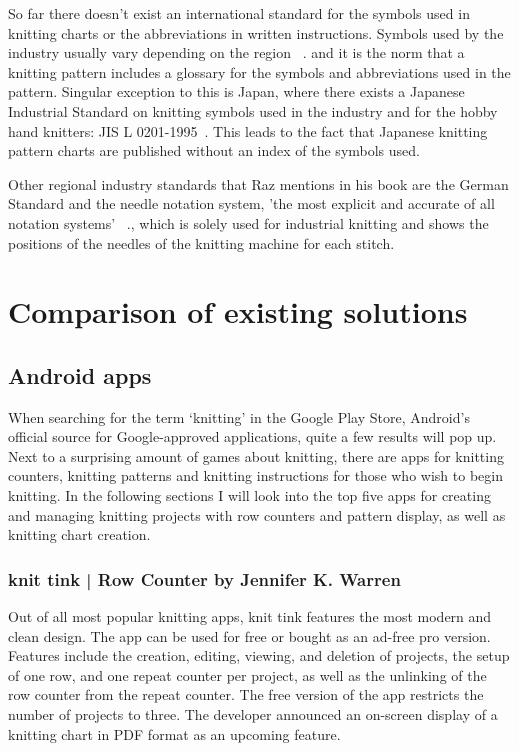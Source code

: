\documentclass[a4paper,11pt]{kth-mag}
\begin{document}
So far there doesn't exist an international standard for the symbols used in
knitting charts or the abbreviations in written instructions. Symbols used by
the industry usually vary depending on the region ~\cite[p57]{raz1993}. and it is the
norm that a knitting pattern includes a glossary for the symbols and
abbreviations used in the pattern. Singular exception to this is Japan, where
there exists a Japanese Industrial Standard on knitting symbols used in the
industry and for the hobby hand knitters: JIS L 0201-1995~\cite{jkca1995}. This
leads to the fact that Japanese knitting pattern charts are published without an
index of the symbols used.

Other regional industry standards that Raz mentions in his book are the German
Standard and the needle notation system, 'the most explicit and accurate of all
 notation systems' ~\cite[p58]{raz1993}., which is solely used for industrial knitting
 and shows the positions of the needles of the knitting machine for each stitch.

\section{Comparison of existing solutions}

\subsection{Android apps}
When searching for the term ‘knitting’ in the Google Play Store, Android’s
official source for Google-approved applications, quite a few results will pop
up. Next to a surprising amount of games about knitting, there are apps for
knitting counters, knitting patterns and knitting instructions for those who
wish to begin knitting. In the following sections I will look into the top five
apps for creating and managing knitting projects with row counters and pattern
display, as well as knitting chart creation.

\subsubsection{knit tink | Row Counter by Jennifer K. Warren}
Out of all most popular knitting apps, knit tink features the most modern and
clean design. The app can be used for free or bought as an ad-free pro version.
Features include the creation, editing, viewing, and deletion of projects, the
setup of one row, and one repeat counter per project, as well as the unlinking
of the row counter from the repeat counter. The free version of the app
restricts the number of projects to three. The developer announced an on-screen
display of a knitting chart in PDF format as an upcoming feature.
\end{document}
